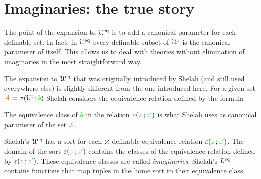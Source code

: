 
\section{Imaginaries: the true story}\label{imaginaries_long}

The point of the expansion to $\EuScript U^{{\rm eq}}$ is to add a canonical parameter for each definable set.
In fact, in $\EuScript U^{{\rm eq}}$ every definable subset of $\EuScript U^{\color{green} z}$ is the canonical parameter of itself.
This allows us to deal with theories without elimination of imaginaries in the most straightforward way.

The expansion to $\EuScript U^{{\rm eq}}$ that was originally introduced by Shelah (and still used everywhere else) is slightly different from the one introduced here.
For a given set ${\color{brown}\EuScript A}=\sigma(\EuScript U^{\color{brown} x};{\color{green} b})$ Shelah considers the equivalence relation defined by the formula


The equivalence class of ${\color{green} b}$ in the relation $\varepsilon({\color{green} z}\,;{\color{green} z'})$ is what Shelah uses as canonical parameter of the set ${\color{brown}\EuScript A}$.

Shelah's $\EuScript U^{{\rm eq}}$ has a sort for each $\varnothing$-definable equivalence relation $\varepsilon({\color{green} z}\,;{\color{green} z'})$.
The domain of the sort $\varepsilon({\color{green} z}\,;{\color{green} z'})$ contains the classes of the equivalence relation defined by $\varepsilon({\color{green} z}\,;{\color{green} z'})$.
These equivalence classes are called \emph{imaginaries}.
Shelah's $L^{{\rm eq}}$ contains functions that map tuples in the home sort to their equivalence class.

